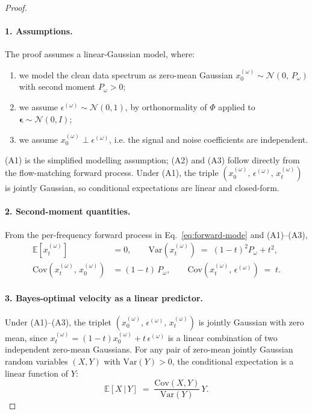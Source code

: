 \begin{proof}
\leavevmode

\paragraph{1. Assumptions.} The proof assumes a linear-Gaussian model, where:
\begin{enumerate}
  \item[(A1)] we model the clean data spectrum as zero-mean Gaussian $x_0^{(\omega)} \sim \mathcal{N}(0,\, P_\omega)$ with second moment $P_\omega > 0$;
  \item[(A2)] we assume $\epsilon^{(\omega)} \sim \mathcal{N}(0, 1)$, by orthonormality of $\Phi$ applied to $\boldsymbol{\epsilon} \sim \mathcal{N}(0, I)$;
  \item[(A3)] we assume $x_0^{(\omega)} \perp \epsilon^{(\omega)}$, i.e. the signal and noise coefficients are independent.
\end{enumerate}
(A1) is the simplified modelling assumption; (A2) and (A3) follow directly from the flow-matching forward process. Under (A1), the triple $(x_0^{(\omega)},\, \epsilon^{(\omega)},\, x_t^{(\omega)})$ is jointly Gaussian, so conditional expectations are linear and closed-form.

\paragraph{2. Second-moment quantities.} From the per-frequency forward process in Eq.~\eqref{eq:forward-mode} and (A1)--(A3),
\begin{align}
  \mathbb{E}[x_t^{(\omega)}]                     &= 0, \qquad
  \mathrm{Var}(x_t^{(\omega)}) \;=\; (1-t)^2 P_\omega + t^2,  \\
  \mathrm{Cov}(x_t^{(\omega)},\, x_0^{(\omega)})      &= (1-t)\,P_\omega, \qquad
  \mathrm{Cov}(x_t^{(\omega)},\, \epsilon^{(\omega)}) \;=\; t.
\end{align}

\paragraph{3. Bayes-optimal velocity as a linear predictor.}
Under (A1)--(A3), the triplet $(x_0^{(\omega)},\, \epsilon^{(\omega)},\, x_t^{(\omega)})$ is jointly Gaussian with zero mean, since $x_t^{(\omega)} = (1-t) x_0^{(\omega)} + t\,\epsilon^{(\omega)}$ is a linear combination of two independent zero-mean Gaussians. For any pair of zero-mean jointly Gaussian random variables $(X, Y)$ with $\mathrm{Var}(Y) > 0$, the conditional expectation is a linear function of $Y$:
\begin{equation}
  \mathbb{E}[X \,|\, Y] \;=\; \frac{\mathrm{Cov}(X, Y)}{\mathrm{Var}(Y)}\,Y.
  \label{eq:gauss-cond}
\end{equation}


\end{proof}
